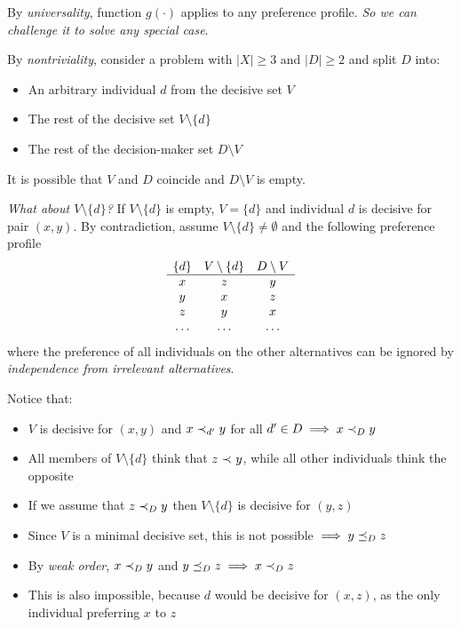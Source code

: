 By \textit{universality}, function $g(\cdot)$ applies to any preference profile. \textit{So we can challenge it to solve any special case}.

By \textit{nontriviality}, consider a problem with $|X| \geq 3$ and $|D| \geq 2$ and split $D$ into: 
\begin{itemize}
	\item An arbitrary individual $d$ from the decisive set $V$
	
	\item The rest of the decisive set $V \setminus \{d\}$
	
	\item The rest of the decision-maker set $D \setminus V$
\end{itemize}
It is possible that $V$ and $D$ coincide and $D \setminus V$ is empty.

\textit{What about $V \setminus\{d\}$?} If $V \setminus \{d\}$ is empty, $V = \{d\}$ and individual $d$ is decisive for pair $(x, y)$. By contradiction, assume $V \setminus \{d\} \neq \emptyset$ and the following preference profile
$$ 
\begin{array}{c c c}
	\{d\} & V \setminus \{d\} & D \setminus V \\
	\hline
	x & z & y  \\
	y & x & z  \\
	z & y & x  \\
	\dots & \dots & \dots 
\end{array}
$$
where the preference of all individuals on the other alternatives can be ignored by \textit{independence from irrelevant alternatives}.

Notice that: 
\begin{itemize}
	\item $V$ is decisive for $(x,y)$ and $x \prec_{d'} y$ for all $d' \in D \implies x \prec_{D} y$
	
	\item All members of $V \setminus \{d\}$ think that $z \prec_{} y$, while all other individuals think the opposite
	
	\item If we assume that $z \prec_{D} y$ then $V \setminus \{d\}$ is decisive for $(y, z)$
	
	\item Since $V$ is a minimal decisive set, this is not possible $\implies y \preceq_{D} z$
	
	\item By \textit{weak order}, $x \prec_{D} y$ and $y \preceq_{D} z \implies x \prec_{D} z$
	
	\item This is also impossible, because $d$ would be decisive for $(x, z)$, as the only individual preferring $x$ to $z$
\end{itemize}


